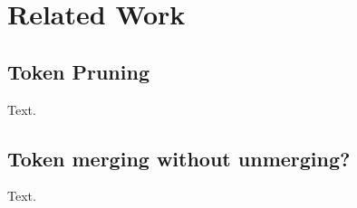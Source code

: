\section{Related Work}

\subsection{Token Pruning}
Text.

\subsection{Token merging without unmerging?}
Text.
